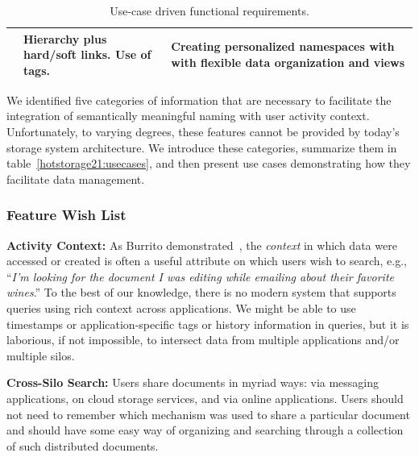 \begin{table}[!th]
{\begin{tabular}{p{}p{}p{}}
            \\
            \usecasepersnamespace                                                                                                                                   &
            Hierarchy plus hard/soft links. Use of tags.                                                                                                            &
            Creating personalized namespaces with with flexible data organization and views
            \\
            \hline
        \end{tabular}
    }
    \caption{Use-case driven functional requirements.}
    \label{hotstorage21:usecases}
\end{table}


We identified five categories of information that are necessary to facilitate the integration of semantically meaningful naming with user activity context.
Unfortunately, to varying degrees, these features cannot be provided by today's storage system architecture.
We introduce these categories, summarize them in table~\autoref{hotstorage21:usecases},
and then present use cases demonstrating how they facilitate data management.

\subsubsection{Feature Wish List}
\label{hotstorage:features}
\noindent\textbf{Activity Context: }
As Burrito demonstrated~\cite{guo2012burrito}, the \emph{context} in which data were accessed or created is often a useful attribute on which users wish to search, e.g., ``\emph{I'm looking for the document I was editing while emailing \persa about their favorite wines}.''
To the best of our knowledge, there is no modern system that supports queries using rich context across applications.
We might be able to use timestamps or application-specific tags or history information in queries, but it is laborious, if not impossible, to intersect data from multiple applications and/or multiple silos.

\noindent\textbf{Cross-Silo Search: }
Users share documents in myriad ways: via messaging applications, on cloud storage services, and via online applications. Users should not need to remember which mechanism was used to share a particular document and should have some easy way of organizing and searching through a collection of such distributed documents.

